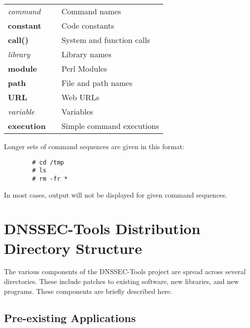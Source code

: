 \documentclass[12pt]{article}
\newcommand{\cmd}[1]{{\em #1}}
\newcommand{\const}[1]{{\bf #1}}
\newcommand{\func}[1]{{\bf #1}}
\newcommand{\lib}[1]{{\em #1}}
\newcommand{\perlmod}[1]{{\bf #1}}
\newcommand{\path}[1]{{\bf #1}}
\newcommand{\url}[1]{{\bf #1}}
\newcommand{\var}[1]{{\em #1}}
\newcommand{\xqt}[1]{{\bf #1}}
\begin{document}
\begin{table}[hb]
\begin{tabular}{lll}
\cmd{command}		& & Command names\\
\const{constant}	& & Code constants\\
\func{call()}		& & System and function calls\\
\lib{library}		& & Library names\\
\perlmod{module}	& & Perl Modules\\
\path{path}		& & File and path names\\
\url{URL}		& & Web URLs\\
\var{variable}		& & Variables\\
\xqt{execution}		& & Simple command executions\\
\end{tabular}
\end{table}

Longer sets of command sequences are given in this format:
\begin{verbatim}
        # cd /tmp
        # ls
        # rm -fr *
\end{verbatim}
In most cases, output will not be displayed for given command sequences.


\clearpage

\section{DNSSEC-Tools Distribution Directory Structure}
\label{directorystructure}

The various components of the DNSSEC-Tools project are spread across several
directories.  These include patches to existing software, new libraries, and
new programs.  These components are briefly described here.


\subsection{Pre-existing Applications}
\end{document}
